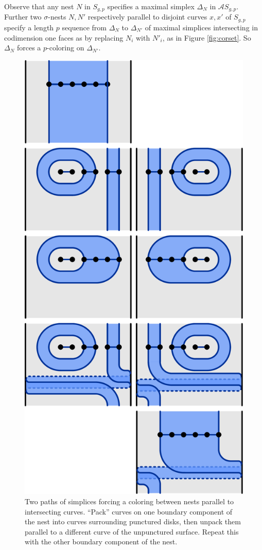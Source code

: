 \begin{example}
  \label{example:nests}

  Observe that any nest $N$ in $S_{g,p}$
  specifies a maximal simplex  $\Delta_N$  in $\mathcal A S_{g,p}$.
  Further two $\sigma$-nests $N,N'$ respectively parallel to
  disjoint curves $x,x'$ of $S_{g,p}$
  specify a length $p$ sequence from $\Delta_N$ to $\Delta_{N'}$ of maximal simplices intersecting
  in codimension one faces as by replacing $N_i$ with $N'_i$, as in Figure \ref{fig:corset}.
  So $\Delta_{N}$ forces a $p$-coloring on $\Delta_{N'}$.

  \begin{figure}[h!]
    \centering
    \includegraphics[width=.5\textwidth]{figures/nests.pdf}
    \caption{Two paths of simplices forcing  a coloring between nests parallel to intersecting curves.
    ``Pack'' curves on one boundary component of the nest into curves surrounding punctured disks,
    then unpack them parallel to a different curve of the unpunctured surface.
    Repeat this with the other boundary component of the nest.
    }
    \label{fig:nests}
  \end{figure}


\end{example}
